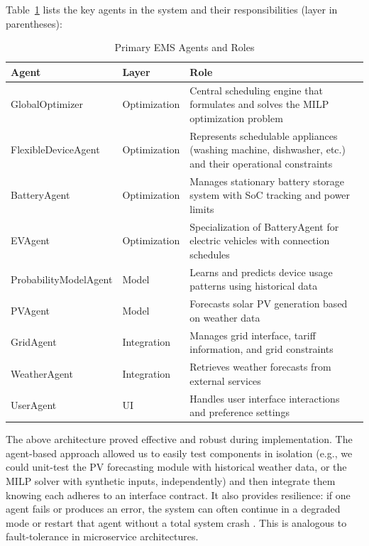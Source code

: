 \documentclass[12pt,a4paper]{article}
\begin{document}
Table~\ref{tab:agents} lists the key agents in the system and their responsibilities (layer in parentheses):
\begin{table}[h!]
\centering
\caption{Primary EMS Agents and Roles}
\label{tab:agents}
\begin{tabular}{p{3.5cm}p{2cm}p{8cm}}
\toprule
\textbf{Agent} & \textbf{Layer} & \textbf{Role} \\
\midrule
GlobalOptimizer & Optimization & Central scheduling engine that formulates and solves the MILP optimization problem \cite{AlSorour2022, Koltsaklis2019} \\
\midrule
FlexibleDeviceAgent & Optimization & Represents schedulable appliances (washing machine, dishwasher, etc.) and their operational constraints \cite{Yoshida2018, Mahmoudi2020} \\
\midrule
BatteryAgent & Optimization & Manages stationary battery storage system with SoC tracking and power limits \cite{Yoshida2018, Mahmoudi2020} \\
\midrule
EVAgent & Optimization & Specialization of BatteryAgent for electric vehicles with connection schedules \cite{Yoshida2018, Mahmoudi2020} \\
\midrule
ProbabilityModelAgent & Model & Learns and predicts device usage patterns using historical data \cite{Yoshida2018, Mahmoudi2020} \\
\midrule
PVAgent & Model & Forecasts solar PV generation based on weather data \cite{Yoshida2018, Mahmoudi2020} \\
\midrule
GridAgent & Integration & Manages grid interface, tariff information, and grid constraints \cite{Yoshida2018, Mahmoudi2020} \\
\midrule
WeatherAgent & Integration & Retrieves weather forecasts from external services \\
\midrule
UserAgent & UI & Handles user interface interactions and preference settings \\
\bottomrule
\end{tabular}
\end{table}

The above architecture proved effective and robust during implementation. The agent-based approach allowed us to easily test components in isolation (e.g., we could unit-test the PV forecasting module with historical weather data, or the MILP solver with synthetic inputs, independently) and then integrate them knowing each adheres to an interface contract. It also provides resilience: if one agent fails or produces an error, the system can often continue in a degraded mode or restart that agent without a total system crash \cite{Chen2024, Koltsaklis2019}. This is analogous to fault-tolerance in microservice architectures. 
\end{document}
